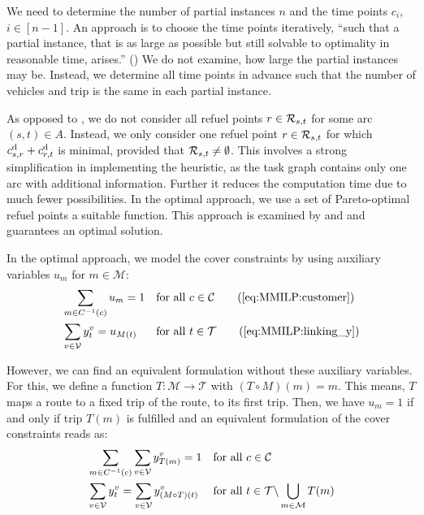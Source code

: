 We need to determine the number of partial instances $n$ and the time points $c_i$, ${i\in[n-1]}$. An approach is to choose the time points iteratively, \enquote{such that a partial instance, that is as large as possible but still solvable to optimality in reasonable time, arises.} (\cite[p.~131]{Knoll}) We do not examine, how large the partial instances may be. Instead, we determine all time points in advance such that the number of vehicles and trip is the same in each partial instance.

As opposed to , we do not consider all refuel points $r\in\mathcal{R}_{s,t}$ for some arc $(s,t)\in A$. Instead, we only consider one refuel point $r\in\mathcal{R}_{s,t}$ for which ${c^{\operatorname{d}}_{s,r} + c^{\operatorname{d}}_{r,t}}$ is minimal, provided that ${\mathcal{R}_{s,t}\neq\emptyset}$. This involves a strong simplification in implementing the heuristic, as the task graph contains only one arc with additional information. Further it reduces the computation time due to much fewer possibilities. In the optimal approach, we use a set of Pareto-optimal refuel points \wrt a suitable function. This approach is examined by \cite[Sec.~3.2.2]{Kaiser} and \cite[Sec.~3.2.2]{Knoll} and guarantees an optimal solution.

In the optimal approach, we model the cover constraints by using auxiliary variables $u_m$ for ${m\in\mathcal{M}}$:
\begin{align*}
	& \sum_{m\in C^{-1}(c)} u_m = 1 && \text{for all } c\in\mathcal{C} \tag{\ref{eq:MMILP:customer}} \\
	& \sum_{v\in\mathcal{V}} y^v_t = u_{M(t)} && \text{for all } t\in\mathcal{T} \tag{\ref{eq:MMILP:linking_y}}
\end{align*}

However, we can find an equivalent formulation without these auxiliary variables. For this, we define a function ${T:\mathcal{M}\to\mathcal{T}}$ with ${\left(T\circ M\right)(m)=m}$. This means, $T$ maps a route to a fixed trip of the route, \eg to its first trip. Then, we have ${u_m=1}$ if and only if trip $T(m)$ is fulfilled and an equivalent formulation of the cover constraints reads as:
\begin{align*}
	& \sum_{m\in C^{-1}(c)} \sum_{v\in\mathcal{V}} y^v_{T(m)} = 1 && \text{for all } c\in\mathcal{C} \\
	& \sum_{v\in\mathcal{V}} y^v_t = \sum_{v\in\mathcal{V}} y^v_{(M\circ T)(t)} && \text{for all } t\in\mathcal{T}\backslash\bigcup_{m\in\mathcal{M}} T(m)
\end{align*}

